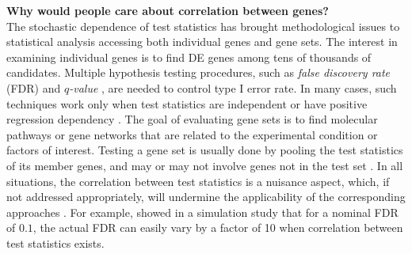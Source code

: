 \documentclass[12pt, a4paper]{article}
\begin{document}
	\textbf{Why would people care about correlation between genes?}\\
	 The stochastic dependence of test statistics has brought methodological issues to statistical 
	 analysis accessing both individual genes and gene sets. 
	 The interest in examining individual genes is to find DE genes among tens of thousands of candidates. Multiple hypothesis testing 
	 procedures, such as \textit{false discovery rate} (FDR) \citep{benjamini1995controlling} and \textit{$q$-value} \citep{storey2003positive}, 
	 are needed to control type I error rate. In many cases, such techniques work only 
	 when test statistics are independent \citep{benjamini1995controlling} or 
	 have positive regression dependency \citep{benjamini2001control}. The goal of evaluating gene sets is to find molecular pathways or gene 
	 networks that are related to the experimental condition or factors of interest. Testing a gene set is usually done by pooling the test 
	 statistics of its member genes, and may or may not involve genes not in the test set \citep{goeman2007analyzing}. In all situations, the 
	 correlation between test statistics is a nuisance aspect, which, if not addressed appropriately, will undermine the applicability of the 
	 corresponding approaches \citep{gatti2010heading, wu2012camera}. For
	 example, \citet{efron2007correlation} showed in a simulation study that for a nominal FDR of 
	 $0.1$, the actual FDR can easily vary by a factor of 10 when correlation between test 
	 statistics 
	 exists. 
	 
\end{document}
